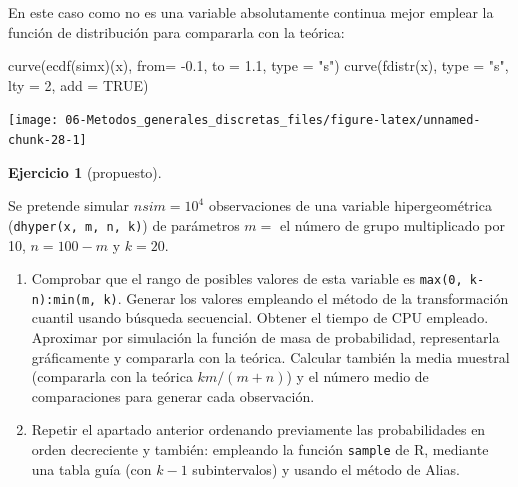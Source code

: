 \documentclass[
]{book}
\newenvironment{Shaded}{\begin{snugshade}}{\end{snugshade}}
\newcommand{\AttributeTok}[1]{\textcolor[rgb]{0.77,0.63,0.00}{#1}}
\newcommand{\ConstantTok}[1]{\textcolor[rgb]{0.00,0.00,0.00}{#1}}
\newcommand{\DecValTok}[1]{\textcolor[rgb]{0.00,0.00,0.81}{#1}}
\newcommand{\FloatTok}[1]{\textcolor[rgb]{0.00,0.00,0.81}{#1}}
\newcommand{\FunctionTok}[1]{\textcolor[rgb]{0.00,0.00,0.00}{#1}}
\newcommand{\NormalTok}[1]{#1}
\newcommand{\SpecialCharTok}[1]{\textcolor[rgb]{0.00,0.00,0.00}{#1}}
\newcommand{\StringTok}[1]{\textcolor[rgb]{0.31,0.60,0.02}{#1}}
\theoremstyle{break}
\theoremstyle{definition}
\theoremstyle{definition}
\theoremstyle{definition}
\newtheorem{exercise}{Ejercicio}[chapter]
\theoremstyle{definition}
\theoremstyle{remark}
\begin{document}
\begin{enumerate}
  En este caso como no es una variable absolutamente continua mejor emplear
  la función de distribución para compararla con la teórica:

\begin{Shaded}
\begin{Highlighting}[]
\FunctionTok{curve}\NormalTok{(}\FunctionTok{ecdf}\NormalTok{(simx)(x), }\AttributeTok{from=} \SpecialCharTok{{-}}\FloatTok{0.1}\NormalTok{, }\AttributeTok{to =} \FloatTok{1.1}\NormalTok{, }\AttributeTok{type =} \StringTok{"s"}\NormalTok{)}
\FunctionTok{curve}\NormalTok{(}\FunctionTok{fdistr}\NormalTok{(x), }\AttributeTok{type =} \StringTok{"s"}\NormalTok{, }\AttributeTok{lty =} \DecValTok{2}\NormalTok{, }\AttributeTok{add =} \ConstantTok{TRUE}\NormalTok{)}
\end{Highlighting}
\end{Shaded}

  \begin{center}\texttt{[image: 06-Metodos\_generales\_discretas\_files/figure-latex/unnamed-chunk-28-1]} \end{center}
\end{enumerate}

\begin{exercise}[propuesto]
\protect\hypertarget{exr:hipergeom}{}{\label{exr:hipergeom} {} }
\end{exercise}

Se pretende simular \(nsim=10^{4}\) observaciones de una variable
hipergeométrica (\texttt{dhyper(x,\ m,\ n,\ k)}) de parámetros \(m=\) el número
de grupo multiplicado por 10, \(n=100-m\) y \(k=20\).

\begin{enumerate}
\def\labelenumi{\alph{enumi})}
\item
  Comprobar que el rango de posibles valores de esta variable es
  \texttt{max(0,\ k-n):min(m,\ k)}. Generar los valores empleando el método
  de la transformación cuantil usando búsqueda secuencial. Obtener
  el tiempo de CPU empleado. Aproximar por simulación la función
  de masa de probabilidad, representarla gráficamente y compararla
  con la teórica. Calcular también la media muestral (compararla
  con la teórica \(km/(m+n)\)) y el número medio de comparaciones
  para generar cada observación.
\item
  Repetir el apartado anterior ordenando previamente las
  probabilidades en orden decreciente y también: empleando la
  función \texttt{sample} de R, mediante una tabla guía (con
  \(k-1\) subintervalos) y usando el método de Alias.
\end{enumerate}
\end{document}
